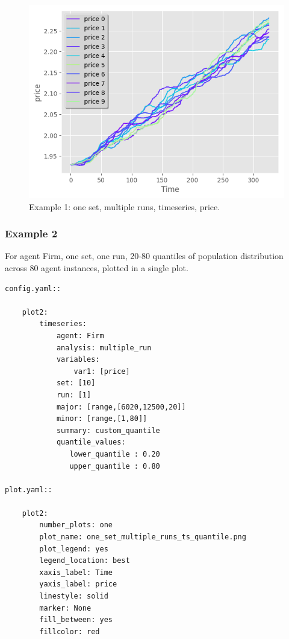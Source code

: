 \documentclass[10pt,a4paper]{article}
\begin{document}
\begin{figure}[b!]\centering\leavevmode
\includegraphics[scale=.7]{./plots_tut_2/one_set_multiple_runs_timeseries_price.png} 
\caption{\footnotesize  Example 1: one set, multiple runs, timeseries, price.}
\end{figure}

\clearpage
\subsubsection{Example 2}
For agent Firm, one set, one run, 20-80 quantiles of population distribution across 80 agent instances, plotted in a single plot.

\begin{lstlisting}
config.yaml::

    plot2:
        timeseries:
            agent: Firm
            analysis: multiple_run
            variables:
                var1: [price]
            set: [10]
            run: [1]
            major: [range,[6020,12500,20]]
            minor: [range,[1,80]] 
            summary: custom_quantile
            quantile_values:          
               lower_quantile : 0.20
               upper_quantile : 0.80

plot.yaml::

    plot2:
        number_plots: one
        plot_name: one_set_multiple_runs_ts_quantile.png
        plot_legend: yes
        legend_location: best
        xaxis_label: Time
        yaxis_label: price
        linestyle: solid
        marker: None
        fill_between: yes
        fillcolor: red
\end{lstlisting}
\end{document}
